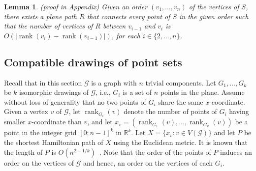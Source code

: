 \documentclass{patmorin}
\newcommand{\appendixproof}{(proof in Appendix)\xspace}
\newtheorem{lemma}[theorem]{Lemma}
\DeclareMathOperator{\rank}{rank}
\begin{document}
\begin{lemma}\label{lemma:Compatible augmentation for trivial components} \appendixproof
Given an order $(v_1, \ldots, v_n)$ of the vertices of $S$, there exists a plane path $R$ that connects every point of $S$ in the given order such that the number of vertices of $R$ between $v_{i-1}$ and $v_{i}$ is $O(|\rank(v_i) - \rank(v_{i-1})|)$, for each $i\in \{2,\dots,n\}$.
\end{lemma}

\vspace{-.1in}
\subsection{Compatible drawings of point sets}\vspace{-.1in}
Recall that in this section $\mathcal G$ is a graph with $n$ trivial components.
Let $G_1, \ldots, G_k$ be $k$ isomorphic drawings of $\mathcal G$, i.e., $G_i$ is a set of $n$ points in the plane.
Assume without loss of generality that no two points of $G_i$ share the same $x$-coordinate.
Given a vertex $v$ of $\mathcal G$, let $\rank_{G_i}(v)$ denote the number of points of $G_i$ having smaller $x$-coordinate than $v$, and let $x_v = (\rank_{G_1}(v), \ldots, \rank_{G_k}(v))$ be a point in the integer grid $[0;n-1]^k$ in $\mathbb{R}^k$.  Let $X = \{x_v : v\in V(\mathcal G)\}$ and let $P$ be the shortest Hamiltonian path of $X$ using the Euclidean metric.  It is known that the length of
$P$ is $O(n^{2-1/k})$~\cite{steele.snyder:worst}.
Note that the order of the points of $P$ induces an order on the vertices of $\mathcal G$ and hence, an order on the vertices of each $G_i$.
\end{document}
